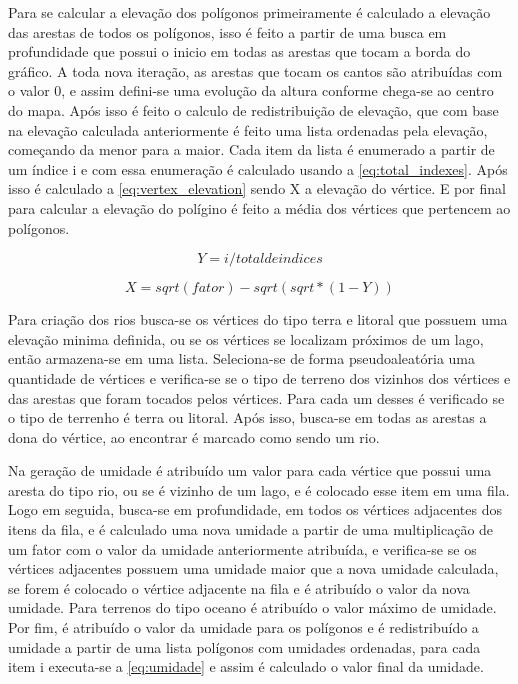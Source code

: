 Para se calcular a elevação dos polígonos primeiramente é calculado a elevação das arestas de todos os polígonos, isso é feito a partir de uma busca em profundidade que possui o inicio em todas as arestas que tocam a borda do gráfico. A toda nova iteração, as arestas que tocam os cantos são atribuídas com o valor 0, e assim defini-se uma evolução da altura conforme chega-se ao centro do mapa.
Após isso é feito o calculo de redistribuição de elevação, que com base na elevação calculada anteriormente é feito uma lista ordenadas pela elevação, começando da menor para a maior. Cada item da lista é enumerado a partir de um índice i e com essa enumeração é calculado usando a \cref{eq:total_indexes}. Após isso é calculado a \cref{eq:vertex_elevation} sendo X a elevação do vértice.
E por final para calcular a elevação do polígino é feito a média dos vértices que pertencem ao polígonos.

\begin{equation}
	\label{eq:total_indexes}
	Y = i / total de indices
\end{equation}

\begin{equation}
	\label{eq:vertex_elevation}
	X = sqrt(fator) - sqrt(sqrt * (1 - Y))
\end{equation}

Para criação dos rios busca-se os vértices do tipo terra e litoral que possuem uma elevação minima definida, ou se os vértices se localizam próximos de um lago, então armazena-se em uma lista. Seleciona-se de forma pseudoaleatória uma quantidade de vértices e verifica-se se o tipo de terreno dos vizinhos dos vértices e das arestas que foram tocados pelos vértices. Para cada um desses é verificado se o tipo de terrenho é terra ou litoral. Após isso, busca-se em todas as arestas a dona do vértice, ao encontrar é marcado como sendo um rio.

Na geração de umidade é atribuído um valor para cada vértice que possui uma aresta do tipo rio, ou se é vizinho de um lago, e é colocado esse item em uma fila. Logo em seguida, busca-se em profundidade, em todos os vértices adjacentes dos itens da fila, e é calculado uma nova umidade a partir de uma multiplicação de um fator com o valor da umidade anteriormente atribuída, e verifica-se se os vértices adjacentes possuem uma umidade maior que a nova umidade calculada, se forem é colocado o vértice adjacente na fila e é atribuído o valor da nova umidade. Para terrenos do tipo oceano é atribuído o valor máximo de umidade.
Por fim, é atribuído o valor da umidade para os polígonos e é redistribuído a umidade a partir de uma lista polígonos com umidades ordenadas, para cada item i executa-se a \cref{eq:umidade} e assim é calculado o valor final da umidade.


